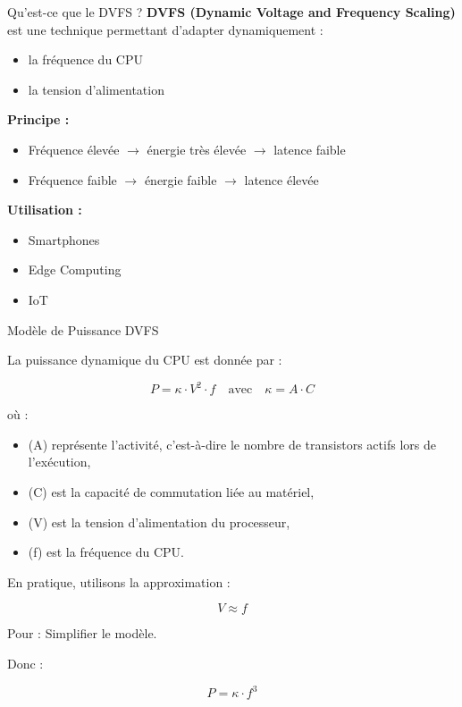 \documentclass[10pt,aspectratio=169]{beamer}
\begin{document}
\begin{frame}{Qu'est-ce que le DVFS ?}
\textbf{DVFS (Dynamic Voltage and Frequency Scaling)} est une technique permettant d'adapter dynamiquement :

\begin{itemize}
\item la fréquence du CPU
\item la tension d'alimentation
\end{itemize}

\vspace{0.5cm}

\textbf{Principe :}
\begin{itemize}
\item Fréquence élevée $\rightarrow$ énergie très élevée $\rightarrow$ latence faible 
\item Fréquence faible $\rightarrow$ énergie faible $\rightarrow$ latence élevée 
\end{itemize}

\vspace{0.5cm}

\textbf{Utilisation :}
\begin{itemize}
\item Smartphones
\item Edge Computing
\item IoT
\end{itemize}

\end{frame}

\begin{frame}{Modèle de Puissance DVFS}

La puissance dynamique du CPU est donnée par :

\begin{equation}
P = \kappa \cdot V^2 \cdot f \quad \text{avec} \quad \kappa = A \cdot C
\end{equation}

où :
\begin{itemize}
    \item (A) représente l’activité, c’est-à-dire le nombre de transistors actifs lors de l’exécution,
    \item (C) est la capacité de commutation liée au matériel,
    \item (V) est la tension d’alimentation du processeur,
    \item (f) est la fréquence du CPU.
\end{itemize}
\vspace{0.3cm}

En pratique, utilisons la approximation :

\begin{equation}
V \approx f
\end{equation}

Pour : Simplifier le modèle.
\vspace{0.3cm}

Donc :

\begin{equation}
P = \kappa \cdot f^3
\end{equation}

\end{frame}
\end{document}
